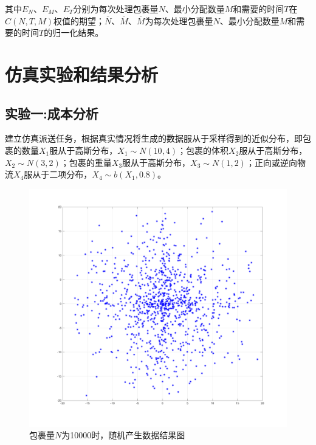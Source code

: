\documentclass[10.5pt,twocolumn]{jbuaa}
\begin{document}
	其中$E_{N}$、$E_{M}$、$E_{T}$分别为每次处理包裹量$N$、最小分配数量$M$和需要的时间$T$在$C(N,T,M)$权值的期望；$\overline N$、$\overline M$、$\overline M$为每次处理包裹量$N$、最小分配数量$M$和需要的时间$T$的归一化结果。
















	\section{仿真实验和结果分析}

	\subsection{实验一:成本分析}
	建立仿真派送任务，根据真实情况将生成的数据服从于采样得到的近似分布，即包裹的数量$X_{1}$服从于高斯分布，$X_{1} \sim N(10,4)$；包裹的体积$X_{2}$服从于高斯分布，$X_{2} \sim N(3,2) $；包裹的重量$X_{3}$服从于高斯分布，$X_{3} \sim N(1,2)$；正向或逆向物流$X_{4}$服从于二项分布，$X_{4} \sim b(X_{1},0.8)$。

	\begin{figure}
		\centering
		\includegraphics[scale=0.11]{Figs/uavbefore.png}
		\caption{包裹量$N$为10000时，随机产生数据结果图}
		\label{fig:01}
	\end{figure}
\end{document}
